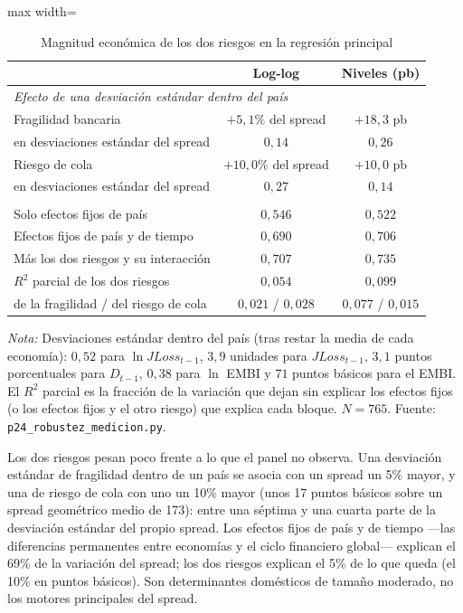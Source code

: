 \begin{table}[htbp]
\centering
\small
\caption[Magnitud económica de los dos riesgos]{Magnitud económica de los dos riesgos en la regresión principal}
\label{tab:magnitud}
\begin{adjustbox}{max width=\linewidth}
\begin{tabular}{l cc}
\toprule
 & Log-log & Niveles (pb) \\
\midrule
\multicolumn{3}{l}{\textit{Efecto de una desviación estándar dentro del país}} \\
\quad Fragilidad bancaria & $+5{,}1\%$ del spread & $+18{,}3$ pb \\
\quad \quad en desviaciones estándar del spread & $0{,}14$ & $0{,}26$ \\
\quad Riesgo de cola & $+10{,}0\%$ del spread & $+10{,}0$ pb \\
\quad \quad en desviaciones estándar del spread & $0{,}27$ & $0{,}14$ \\
\addlinespace
\multicolumn{3}{l}{\textit{Variación del spread explicada ($R^2$)}} \\
\quad Solo efectos fijos de país & $0{,}546$ & $0{,}522$ \\
\quad Efectos fijos de país y de tiempo & $0{,}690$ & $0{,}706$ \\
\quad Más los dos riesgos y su interacción & $0{,}707$ & $0{,}735$ \\
\quad $R^2$ parcial de los dos riesgos & $0{,}054$ & $0{,}099$ \\
\quad \quad de la fragilidad / del riesgo de cola & $0{,}021$ / $0{,}028$ & $0{,}077$ / $0{,}015$ \\
\bottomrule
\end{tabular}
\end{adjustbox}
\par\smallskip\parbox{0.95\linewidth}{\footnotesize \textit{Nota:} Desviaciones estándar dentro del país (tras restar la media de cada economía): $0{,}52$ para $\ln JLoss_{t-1}$, $3{,}9$ unidades para $JLoss_{t-1}$, $3{,}1$ puntos porcentuales para $D_{t-1}$, $0{,}38$ para $\ln$ EMBI y $71$ puntos básicos para el EMBI. El $R^2$ parcial es la fracción de la variación que dejan sin explicar los efectos fijos (o los efectos fijos y el otro riesgo) que explica cada bloque. $N=765$. Fuente: \texttt{p24\_robustez\_medicion.py}.}
\end{table}

Los dos riesgos pesan poco frente a lo que el panel no observa. Una desviación estándar de fragilidad dentro de un país se asocia con un spread un 5\% mayor, y una de riesgo de cola con uno un 10\% mayor (unos 17 puntos básicos sobre un spread geométrico medio de 173): entre una séptima y una cuarta parte de la desviación estándar del propio spread. Los efectos fijos de país y de tiempo ---las diferencias permanentes entre economías y el ciclo financiero global--- explican el 69\% de la variación del spread; los dos riesgos explican el 5\% de lo que queda (el 10\% en puntos básicos). Son determinantes domésticos de tamaño moderado, no los motores principales del spread.

